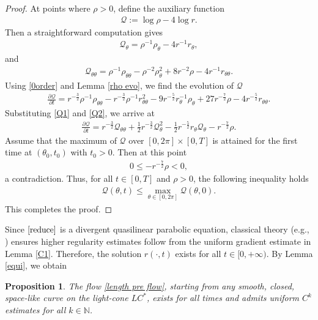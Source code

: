 \documentclass[reqno,11pt, letterpaper]{amsart}
\theoremstyle{plain}
\newtheorem{prop}[thm]{Proposition}
\theoremstyle{definition}
\numberwithin{equation}{section}
\begin{document}
\begin{proof}
	At points where $\rho>0$, define the auxiliary function
	\begin{align*}
		\mathcal{Q}:=\log\rho-4\log r.
	\end{align*}
	Then a straightforward computation gives
	\begin{align}\label{Q1}
		\mathcal{Q}_\theta=\rho^{-1}\rho_\theta-4 r^{-1} r_\theta,
	\end{align}
	and
	\begin{align}\label{Q2}
		\mathcal{Q}_{\theta\theta}=\rho^{-1}\rho_{\theta\theta}-\rho^{-2}\rho_\theta^2+8 r^{-2}\rho-4 r^{-1} r_{\theta\theta}.
	\end{align}
	Using \eqref{0order} and Lemma \ref{rho evo}, we find the evolution of $\mathcal{Q}$ 
	\begin{align*}
		\frac{\partial\mathcal{Q}}{\partial t}= r^{-\frac{3}{2}}\rho^{-1}\rho_{\theta\theta}- r^{-\frac{3}{2}}\rho^{-1} r_{\theta\theta}^2-9 r^{-\frac{5}{2}} r_{\theta}^{-1}\rho_\theta+27 r^{-\frac{7}{2}}\rho-4 r^{-\frac{5}{2}} r_{\theta\theta}.
	\end{align*}
	Substituting \eqref{Q1} and \eqref{Q2}, we arrive at
	\begin{align*}
		\frac{\partial\mathcal{Q}}{\partial t}= r^{-\frac{3}{2}}\mathcal{Q}_{\theta\theta}+\frac{1}{2} r^{-\frac{3}{2}}\mathcal{Q}_\theta^2-\frac{1}{2} r^{-\frac{5}{2}} r_{\theta}\mathcal{Q}_\theta- r^{-\frac{7}{2}}\rho.
	\end{align*}
	Assume that the maximum of $\mathcal{Q}$ over $[0, 2\pi] \times [0, T]$ is attained for the first time at $(\theta_0, t_0)$ with $t_0 > 0$. Then at this point
	\begin{align*}
		0\le- r^{-\frac{7}{2}}\rho<0,
	\end{align*}
	a contradiction. Thus, for all $t\in[0,T]$ and $\rho > 0$, the following inequality holds
	\begin{align*}
		\mathcal{Q}(\theta,t)\le\max\limits_{\theta\in[0,2\pi]}\mathcal{Q}(\theta,0).
	\end{align*}
	This completes the proof.
\end{proof}
Since $\eqref{reduce}$ is a divergent quasilinear parabolic equation, classical theory (e.g., \cite{Lie96}) ensures higher regularity estimates follow from the uniform gradient estimate in Lemma \ref{C1}. Therefore, the solution $ r(\cdot,t)$ exists for all $t \in [0, +\infty)$. By Lemma \ref{equi}, we obtain
\begin{prop}\label{long}
	The flow \eqref{length pre flow}, starting from any smooth, closed, space-like curve on the light-cone $LC^*$,
	exists for all times and admits uniform $C^k$ estimates for all $k \in \mathbb{N}$.
\end{prop}
\end{document}
